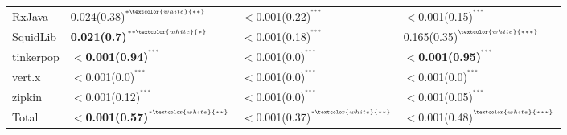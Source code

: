 \begin{tabular}{llll}
RxJava              &  0.024(0.38)\tiny{$^{^{*\textcolor{white}{**}}}$} &  $<$0.001(0.22)\tiny{$^{^{***}}$} &  $<$0.001(0.15)\tiny{$^{^{***}}$} \\
SquidLib            &  \textbf{0.021(0.7)}\tiny{$^{^{**\textcolor{white}{*}}}$} &  $<$0.001(0.18)\tiny{$^{^{***}}$} &  0.165(0.35)\tiny{$^{^{\textcolor{white}{***}}}$} \\
tinkerpop           &  \textbf{$<$0.001(0.94)}\tiny{$^{^{***}}$} &  $<$0.001(0.0)\tiny{$^{^{***}}$} &  \textbf{$<$0.001(0.95)}\tiny{$^{^{***}}$} \\
vert.x              &  $<$0.001(0.0)\tiny{$^{^{***}}$} &  $<$0.001(0.0)\tiny{$^{^{***}}$} &  $<$0.001(0.0)\tiny{$^{^{***}}$} \\
zipkin              &  $<$0.001(0.12)\tiny{$^{^{***}}$} &  $<$0.001(0.0)\tiny{$^{^{***}}$} &  $<$0.001(0.05)\tiny{$^{^{***}}$} \\
Total               &  \textbf{$<$0.001(0.57)}\tiny{$^{^{*\textcolor{white}{**}}}$} &  $<$0.001(0.37)\tiny{$^{^{*\textcolor{white}{**}}}$} &  $<$0.001(0.48)\tiny{$^{^{\textcolor{white}{***}}}$} \\
\bottomrule
\end{tabular}
